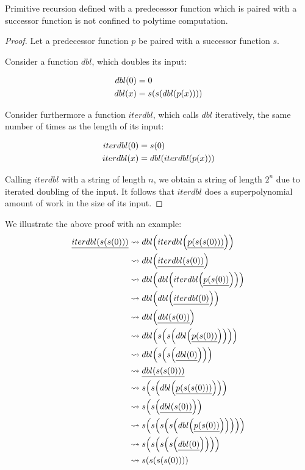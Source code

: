 \begin{theorem}

Primitive recursion defined with a predecessor function which is paired with a
successor function is not confined to polytime computation.

\end{theorem}

\begin{proof} Let a predecessor function $p$ be paired with a successor
function $s$.

Consider a function $dbl$, which doubles its input:

\begin{align}
dbl\p{0} &= 0 \\
dbl\p{x} &= s\p{s\p{dbl\p{p\p{x}}}}
\end{align}

Consider furthermore a function $iterdbl$, which calls $dbl$ iteratively, the
same number of times as the length of its input:

\begin{align}
iterdbl\p{0} &= s\p{0} \\
iterdbl\p{x} &= dbl\p{iterdbl\p{p\p{x}}}
\end{align}

Calling $iterdbl$ with a string of length $n$, we obtain a string of length
$2^n$ due to iterated doubling of the input. It follows that $iterdbl$ does a
superpolynomial amount of work in the size of its input.\end{proof}

\begin{example}
We illustrate the above proof with an example:
\begin{align}
\underline{iterdbl\p{s\p{s\p{0}}}}
  &\leadsto dbl\p{iterdbl\p{\underline{p\p{s\p{s\p{0}}}}}} \\
  &\leadsto dbl\p{\underline{iterdbl\p{s\p{0}}}} \\
  &\leadsto dbl\p{dbl\p{iterdbl\p{\underline{p\p{s\p{0}}}}}} \\
  &\leadsto dbl\p{dbl\p{\underline{iterdbl\p{0}}}} \\
  &\leadsto dbl\p{\underline{dbl\p{s\p{0}}}} \\
  &\leadsto dbl\p{s\p{s\p{dbl\p{\underline{p\p{s\p{0}}}}}}} \\
  &\leadsto dbl\p{s\p{s\p{\underline{dbl\p{0}}}}} \\
  &\leadsto \underline{dbl\p{s\p{s\p{0}}}} \\
  &\leadsto s\p{s\p{dbl\p{\underline{p\p{s\p{s\p{0}}}}}}} \\
  &\leadsto s\p{s\p{\underline{dbl\p{s\p{0}}}}} \\
  &\leadsto s\p{s\p{s\p{s\p{dbl\p{\underline{p\p{s\p{0}}}}}}}} \\
  &\leadsto s\p{s\p{s\p{s\p{\underline{dbl\p{0}}}}}} \\
  &\leadsto s\p{s\p{s\p{s\p{0}}}} \\
\end{align}
\end{example}

